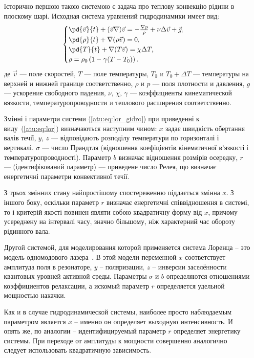 Історично першою такою системою є задача про теплову
конвекцію рідини в плоскому шарі.
%
Исходная система
уравнений гидродинамики имеет вид:
%
%
\begin{equation}
\begin{cases}
  \pd{\vec{v}}{t} + ( \vec{v} \nabla ) \vec{v} = - \frac{\nabla p}{\rho} + \nu \Delta \vec{v} + \vec{g}, \\
  \pd{\rho}{t} + \nabla ( \rho \vec{v} ) = 0 , \\
  \pd{T}{t} +\nabla ( T \vec{v} ) = \chi \Delta T , \\
  \rho = \rho_0 \left( 1 - \gamma (T - T_0) \right) .
\end{cases}
\label{atu:eq:lor_gidro}
\end{equation}
%
де
$\vec{v} $   --- поле скоростей,
$T$ --- поле температуры,
$T_0$ и $T_0+\Delta T$   --- температуры на верхней и нижней границе соответственно,
$\rho$ и $p$ --- поля плотности и давления,
$g$ --- ускорение свободного падения,
$\nu$, $\chi$, $\gamma$  --- коэффициенты кинематической вязкости, температуропроводности и
теплового расширения соответственно.

Змінні і параметри системи (\ref{atu:eq:lor_gidro}) при приведенні к виду~(\ref{atu:eq:lor})
визначаються наступним чином:
$x$ задає швидкість обертання валів течії,
$y$, $z$ --- відповідають розподілу температури по горизонталі і вертикалі.
$\sigma$ --- число Прандтля (відношення коефіцієнтів кінематичної в'язкості і температуропроводності).
Параметр $b$ визначає відношення розмірів осередку,
$r$ --- (ідентифікований параметр) --- приведене число Релея, що визначає енергетичні параметри
конвективної течії.

З трьох змінних стану найпростішому спостереженню піддається змінна $x$.
З іншого боку, оскільки параметр $r$ визначає енергетичні співвідношення в
системі, то і критерій якості повинен являти собою квадратичну форму від $x$,
причому усереднену на інтервалі часу, значно більшому, ніж характерний час
обороту рідинного вала.

Другой системой, для моделирования которой применяется система Лоренца --
это модель одномодового лазера~\cite{andrianov_laser}.
В этой модели переменной $x$ соответствует
амплитуда поля в резонаторе, $y$ -- поляризации, $z$ -- инверсии заселённости
квантовых уровней активной среды. Параметры $\sigma$ и $b$
определяются отношениями коэффициентов релаксации, а искомый параметр $r$
определяется удельной мощностью накачки.

Как и в случае гидродинамической системы, наиболее просто наблюдаемым
параметром является $x$ -- именно он определяет выходную интенсивность. И
опять же, по аналогии -- идентифицируемый параметр $r$ определяет энергетику
системы. При переходе от амплитуды к мощности совершенно аналогично
следует использовать квадратичную зависимость.

